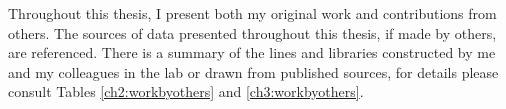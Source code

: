 
\begin{declaration}

Throughout this thesis, I present both my original work and contributions from others. The sources of data presented throughout this thesis, if made by others, are referenced. There is a summary of the lines and libraries constructed by me and my colleagues in the lab or drawn from published sources, for details please consult Tables \ref{ch2:workbyothers} and \ref{ch3:workbyothers}.


\end{declaration}

